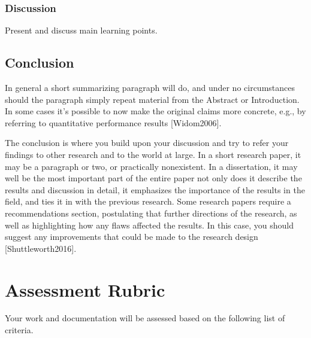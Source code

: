 \documentclass[letterpaper,10pt,english]{sphinxmanual}
\begin{document}
\subsection{Discussion}
\label{\detokenize{docs/ShavitFranchezAlg/results:discussion}}
\sphinxAtStartPar
Present and discuss main learning points.

\sphinxstepscope


\section{Conclusion}
\label{\detokenize{docs/ShavitFranchezAlg/conclusion:conclusion}}\label{\detokenize{docs/ShavitFranchezAlg/conclusion::doc}}
\sphinxAtStartPar
In general a short summarizing paragraph will do, and under no circumstances should the paragraph simply repeat material from the Abstract or Introduction. In some cases it’s possible to now make the original claims more concrete, e.g., by referring to quantitative performance results {[}Widom2006{]}.

\sphinxAtStartPar
The conclusion is where you build upon your discussion and try to refer your findings to other research and to the world at large. In a short research paper, it may be a paragraph or two, or practically non\sphinxhyphen{}existent. In a dissertation, it may well be the most important part of the entire paper \sphinxhyphen{} not only does it describe the results and discussion in detail, it emphasizes the importance of the results in the field, and ties it in with the previous research. Some research papers require a recommendations section, postulating that further directions of the research, as well as highlighting how any flaws affected the results. In this case, you should suggest any improvements that could be made to the research design {[}Shuttleworth2016{]}.

\sphinxstepscope


\chapter{Assessment Rubric}
\label{\detokenize{docs/rubric:assessment-rubric}}\label{\detokenize{docs/rubric::doc}}
\sphinxAtStartPar
Your work and documentation will be assessed based on the following list of criteria.
\end{document}

